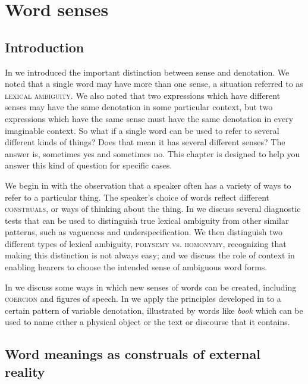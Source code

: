 \chapter{Word senses}\label{sec:5}

\section{Introduction}\label{sec:5.1}

In  we introduced the important distinction between sense and denotation. We noted that a single word may have more than one sense, a situation referred to as \textsc{lexical ambiguity}. We also noted that two expressions which have different senses may have the same denotation in some particular context, but two expressions which have the same sense must have the same denotation in every imaginable context. So what if a single word can be used to refer to several different kinds of things? Does that mean it has several different senses? The answer is, sometimes yes and sometimes no. This chapter is designed to help you answer this kind of question for specific cases.



We begin in  with the observation that a speaker often has a variety of ways to refer to a particular thing. The speaker’s choice of words reflect different \textsc{construals}, or ways of thinking about the thing. In  we discuss several diagnostic tests that can be used to distinguish true lexical ambiguity from other similar patterns, such as vagueness and underspecification. We then distinguish two different types of lexical ambiguity, \textsc{polysemy} vs. \textsc{homonymy}, recognizing that making this distinction is not always easy; and we discuss the role of context in enabling hearers to choose the intended sense of ambiguous word forms.



In  we discuss some ways in which new senses of words can be created, including \textsc{coercion} and figures of speech. In  we apply the principles developed in  to a certain pattern of variable denotation, illustrated by words like \textit{book} which can be used to name either a physical object or the text or discourse that it contains.


\section{Word meanings as construals of external reality}\label{sec:5.2}

